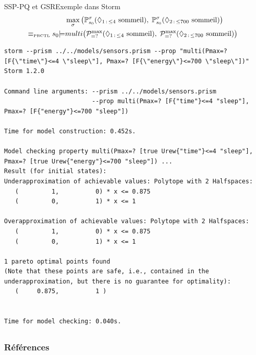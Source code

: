 \documentclass[compress]{beamer}
\theoremstyle{theorem}%
\begin{document}
\begin{frame}[fragile]{SSP-PQ et GSR}{Exemple dans Storm}
    \vspace{-0.05\linewidth}
    \footnotesize
    \begin{align*}
    &\max_\sigma \big(\mathbb{P}^{\sigma}_{s_0}(\Diamond_{1\, :\, \leq 4} \text{ sommeil}), \;
              \mathbb{P}^{\sigma}_{s_0}(\Diamond_{2\, :\, \leq 700} \text{ sommeil}) \big) \\
      \equiv_{\text{\tiny PRCTL}}s_0 {\models} &multi\big( \mathcal{P}^{\max}_{=?} (\Diamond_{1\, :\, \leq 4} \text{ sommeil}), \; \mathcal{P}^{\max}_{=?} (\Diamond_{2\, :\, \leq 700} \text{ sommeil}) \big)
    \end{align*}
  {\fontsize{4}{5}
  \begin{verbatim}
storm --prism ../../models/sensors.prism --prop "multi(Pmax=? [F{\"time\"}<=4 \"sleep\"], Pmax=? [F{\"energy\"}<=700 \"sleep\"])"
Storm 1.2.0

Command line arguments: --prism ../../models/sensors.prism
                        --prop multi(Pmax=? [F{"time"}<=4 "sleep"], Pmax=? [F{"energy"}<=700 "sleep"])

Time for model construction: 0.452s.

Model checking property multi(Pmax=? [true Urew{"time"}<=4 "sleep"], Pmax=? [true Urew{"energy"}<=700 "sleep"]) ...
Result (for initial states):
Underapproximation of achievable values: Polytope with 2 Halfspaces:
   (         1,          0) * x <= 0.875
   (         0,          1) * x <= 1

Overapproximation of achievable values: Polytope with 2 Halfspaces:
   (         1,          0) * x <= 0.875
   (         0,          1) * x <= 1

1 pareto optimal points found
(Note that these points are safe, i.e., contained in the underapproximation, but there is no guarantee for optimality):
   (     0.875,          1 )


Time for model checking: 0.040s.
  \end{verbatim}
  }
\end{frame}



\subsection{}
\begin{frame}[allowframebreaks]
        \nocite{*}
        \frametitle{Références}
      \printbibliography
\end{frame}
\end{document}
